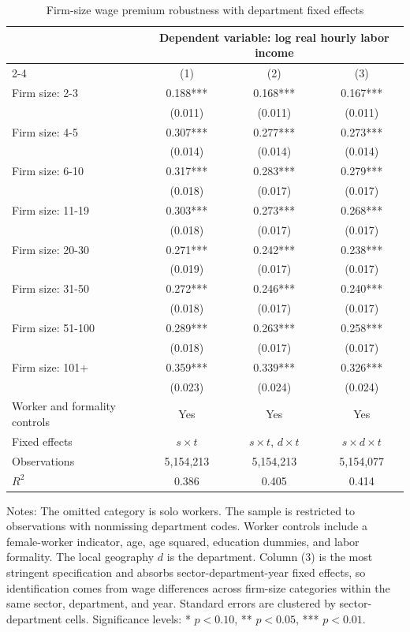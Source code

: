 \begin{table}[htbp]
  \centering
  \caption{Firm-size wage premium robustness with department fixed effects}
  \label{tab:firm-size-local-geography-robustness}
  \small
  \begin{tabular}{lccc}
    \toprule
    & \multicolumn{3}{c}{Dependent variable: log real hourly labor income} \\
    \cmidrule(lr){2-4}
    & (1) & (2) & (3) \\
    \midrule
    Firm size: 2-3 & 0.188*** & 0.168*** & 0.167*** \\
     & (0.011) & (0.011) & (0.011) \\
    Firm size: 4-5 & 0.307*** & 0.277*** & 0.273*** \\
     & (0.014) & (0.014) & (0.014) \\
    Firm size: 6-10 & 0.317*** & 0.283*** & 0.279*** \\
     & (0.018) & (0.017) & (0.017) \\
    Firm size: 11-19 & 0.303*** & 0.273*** & 0.268*** \\
     & (0.018) & (0.017) & (0.017) \\
    Firm size: 20-30 & 0.271*** & 0.242*** & 0.238*** \\
     & (0.019) & (0.017) & (0.017) \\
    Firm size: 31-50 & 0.272*** & 0.246*** & 0.240*** \\
     & (0.018) & (0.017) & (0.017) \\
    Firm size: 51-100 & 0.289*** & 0.263*** & 0.258*** \\
     & (0.018) & (0.017) & (0.017) \\
    Firm size: 101+ & 0.359*** & 0.339*** & 0.326*** \\
     & (0.023) & (0.024) & (0.024) \\
    \midrule
    Worker and formality controls & Yes & Yes & Yes \\
    Fixed effects & $s\times t$ & $s\times t$, $d\times t$ & $s\times d\times t$ \\
    Observations & 5,154,213 & 5,154,213 & 5,154,077 \\
    $R^2$ & 0.386 & 0.405 & 0.414 \\
    \bottomrule
  \end{tabular}
  \vspace{0.3em}
  \begin{minipage}{0.95\textwidth}
  \footnotesize
  Notes: The omitted category is solo workers. The sample is restricted to observations with nonmissing department codes. Worker controls include a female-worker indicator, age, age squared, education dummies, and labor formality. The local geography $d$ is the department. Column (3) is the most stringent specification and absorbs sector-department-year fixed effects, so identification comes from wage differences across firm-size categories within the same sector, department, and year. Standard errors are clustered by sector-department cells. Significance levels: * $p<0.10$, ** $p<0.05$, *** $p<0.01$.
  \end{minipage}
\end{table}
